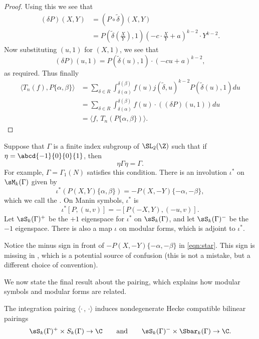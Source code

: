 \begin{proof}
Using this we see that
\begin{align*}
(\delta P)(X,Y) &= (P\circ \tilde{\delta})(X,Y)\\
      &= P\left(\tilde{\delta}\left(\frac{X}{Y}\right),1\right) 
       \left(-c \cdot \frac{X}{Y} + a\right)^{k-2} \cdot Y^{k-2}.
\end{align*}
Now substituting $(u,1)$ for $(X,1)$, we see that
$$ (\delta P)(u,1) = 
  P(\tilde{\delta}(u), 1) \cdot (-c u + a)^{k-2},$$
as required.
Thus finally
\begin{align*}
\langle T_n(f), P\{\alpha,\beta\}\rangle 
  &= \sum_{\delta \in R}\int_{\delta(\alpha)}^{\delta(\beta)}
             f(u) j(\tilde{\delta},u)^{k-2}
             P(\tilde{\delta}(u), 1) du\\
  &= \sum_{\delta \in R} \int_{\delta(\alpha)}^{\delta(\beta)}
           f(u) \cdot ((\delta P)(u,1)) du\\
  &= \langle f, \, T_n(P\{\alpha,\beta\})\rangle.
\end{align*}
\end{proof}


Suppose  that $\Gamma$ is a finite index
subgroup of $\SL_2(\Z)$ such that 
if $\eta = \abcd{-1}{0}{\hfill 0}{1}$, then 
$$
 \eta \Gamma \eta = \Gamma.
$$
For example, $\Gamma=\Gamma_1(N)$ satisfies this condition.
There is an involution $\iota^*$ on $\sM_k(\Gamma)$ given by
\begin{equation}\label{eqn:star}
  \iota^*(P(X,Y)\{\alpha,\beta\})
    = -P(X,-Y)\{-\alpha,-\beta\},
\end{equation}
which we call the .  
On Manin symbols, $\iota^*$ is 
\begin{equation}\label{eqn:iota}
  \iota^*[P,(u,v)] = -[P(-X,Y), (-u,v)].
\end{equation}
Let $\sS_k(\Gamma)^+$ be the $+1$ eigenspace for
$\iota^*$ on $\sS_k(\Gamma)$, and let $\sS_k(\Gamma)^-$ be the $-1$ eigenspace.
There is also a map $\iota$ on modular forms, which
is adjoint to $\iota^*$.
\begin{remark}
  Notice the minus sign in front of $-P(X,-Y)\{-\alpha,-\beta\}$ in
  \eqref{eqn:star}.  This sign is missing in \cite{cremona:algs},
  which is a potential source of confusion (this is not a mistake,
  but  a different choice of convention).
\end{remark}

We now state the final result about the pairing, which
explains how modular symbols and modular forms
are related.
\begin{theorem}\label{thm:modsymformpairing}
  The integration pairing $\langle \cdot\, , \, \cdot \rangle$ induces
  nondegenerate Hecke compatible  bilinear pairings 
$$
 \sS_k(\Gamma)^+ \times S_k(\Gamma) \to \C
\qquad \text{and}\qquad
\sS_k(\Gamma)^- \times \Sbar_k(\Gamma) \to \C.
$$
\end{theorem}


